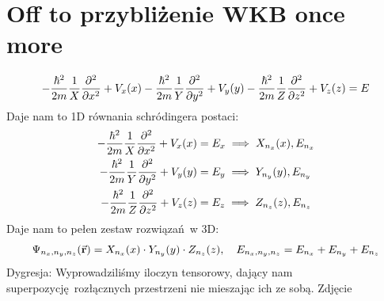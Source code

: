 \documentclass[12pt,a4paper]{report}
\newcommand{\com}[1]{{\color{red} #1}}
\newenvironment{lecture}[1]{\par\medskip
   \noindent\chapter{#1} \rmfamily}{\medskip}
\begin{document}
\begin{lecture}{Off to przybliżenie WKB once more}
\[
    -\frac{\hbar^2}{2m} \frac{1}{X} \pdv[2]{x} + V_x(x) -\frac{\hbar^2}{2m} \frac{1}{Y} \pdv[2]{y} + V_y(y) -\frac{\hbar^2}{2m} \frac{1}{Z} \pdv[2]{z} + V_z(z) = E
\]
Daje nam to 1D równania schródingera postaci:
\begin{align*}
    -\frac{\hbar^2}{2m} \frac{1}{X} \pdv[2]{x} + V_x(x) &= E_x \implies X_{n_x}(x), E_{n_x}\\
    -\frac{\hbar^2}{2m} \frac{1}{Y} \pdv[2]{y} + V_y(y) &= E_y \implies Y_{n_y}(y), E_{n_y}\\
    -\frac{\hbar^2}{2m} \frac{1}{Z} \pdv[2]{z} + V_z(z) &= E_z \implies Z_{n_z}(z), E_{n_z}\\
\end{align*}
Daje nam to pełen zestaw rozwiązań w 3D:
\[
    \Psi_{n_x, n_y, n_z}(\va{r}) = X_{n_x}(x) \cdot Y_{n_y}(y) \cdot Z_{n_z}(z)\qc E_{n_x, n_y, n_z} = E_{n_x} + E_{n_y} + E_{n_z}
\]
Dygresja: Wyprowadziliśmy iloczyn tensorowy, dający nam superpozycję rozłącznych przestrzeni nie mieszając ich ze sobą. 
\com{Zdjęcie}

\end{lecture}

\end{document}
